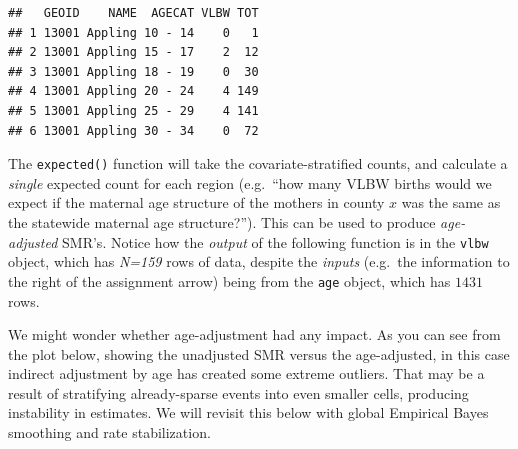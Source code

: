 \documentclass[
]{book}
\newenvironment{Shaded}{\begin{snugshade}}{\end{snugshade}}
\newcommand{\AttributeTok}[1]{\textcolor[rgb]{0.13,0.29,0.53}{#1}}
\newcommand{\CommentTok}[1]{\textcolor[rgb]{0.56,0.35,0.01}{\textit{#1}}}
\newcommand{\DecValTok}[1]{\textcolor[rgb]{0.00,0.00,0.81}{#1}}
\newcommand{\FunctionTok}[1]{\textcolor[rgb]{0.13,0.29,0.53}{\textbf{#1}}}
\newcommand{\NormalTok}[1]{#1}
\newcommand{\OtherTok}[1]{\textcolor[rgb]{0.56,0.35,0.01}{#1}}
\newcommand{\SpecialCharTok}[1]{\textcolor[rgb]{0.81,0.36,0.00}{\textbf{#1}}}
\begin{document}
\begin{verbatim}
##   GEOID    NAME  AGECAT VLBW TOT
## 1 13001 Appling 10 - 14    0   1
## 2 13001 Appling 15 - 17    2  12
## 3 13001 Appling 18 - 19    0  30
## 4 13001 Appling 20 - 24    4 149
## 5 13001 Appling 25 - 29    4 141
## 6 13001 Appling 30 - 34    0  72
\end{verbatim}

The \texttt{expected()} function will take the covariate-stratified counts, and calculate a \emph{single} expected count for each region (e.g.~``how many VLBW births would we expect if the maternal age structure of the mothers in county \(x\) was the same as the statewide maternal age structure?''). This can be used to produce \emph{age-adjusted} SMR's. Notice how the \emph{output} of the following function is in the \texttt{vlbw} object, which has \emph{N=159} rows of data, despite the \emph{inputs} (e.g.~the information to the right of the assignment arrow) being from the \texttt{age} object, which has \(1431\) rows.

\begin{Shaded}
\end{Shaded}

We might wonder whether age-adjustment had any impact. As you can see from the plot below, showing the unadjusted SMR versus the age-adjusted, in this case indirect adjustment by age has created some extreme outliers. That may be a result of stratifying already-sparse events into even smaller cells, producing instability in estimates. We will revisit this below with global Empirical Bayes smoothing and rate stabilization.
\end{document}
